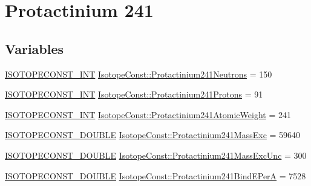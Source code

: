 \hypertarget{group___isotope_const-_protactinium-_pa241}{}\section{Protactinium 241}
\label{group___isotope_const-_protactinium-_pa241}
\subsection*{Variables}
\begin{DoxyCompactItemize}
\item 
\mbox{\hyperlink{group___isotope_const-_macros_ga5f18360b3e99483a35c32d789e62621c}{I\+S\+O\+T\+O\+P\+E\+C\+O\+N\+S\+T\+\_\+\+I\+NT}} \mbox{\hyperlink{group___isotope_const-_protactinium-_pa241_ga96848d089fc9546639a6c1897e31b6eb}{Isotope\+Const\+::\+Protactinium241\+Neutrons}} = 150
\item 
\mbox{\hyperlink{group___isotope_const-_macros_ga5f18360b3e99483a35c32d789e62621c}{I\+S\+O\+T\+O\+P\+E\+C\+O\+N\+S\+T\+\_\+\+I\+NT}} \mbox{\hyperlink{group___isotope_const-_protactinium-_pa241_ga6141335e587b00dd1ee24da6cf1ba240}{Isotope\+Const\+::\+Protactinium241\+Protons}} = 91
\item 
\mbox{\hyperlink{group___isotope_const-_macros_ga5f18360b3e99483a35c32d789e62621c}{I\+S\+O\+T\+O\+P\+E\+C\+O\+N\+S\+T\+\_\+\+I\+NT}} \mbox{\hyperlink{group___isotope_const-_protactinium-_pa241_gad6c15872b7ec3eb84331a6369505485d}{Isotope\+Const\+::\+Protactinium241\+Atomic\+Weight}} = 241
\item 
\mbox{\hyperlink{group___isotope_const-_macros_ga8f45a7272ce02c0b4c65c44636ed719a}{I\+S\+O\+T\+O\+P\+E\+C\+O\+N\+S\+T\+\_\+\+D\+O\+U\+B\+LE}} \mbox{\hyperlink{group___isotope_const-_protactinium-_pa241_ga80c3dda72c91b2072f796718167b7811}{Isotope\+Const\+::\+Protactinium241\+Mass\+Exc}} = 59640
\item 
\mbox{\hyperlink{group___isotope_const-_macros_ga8f45a7272ce02c0b4c65c44636ed719a}{I\+S\+O\+T\+O\+P\+E\+C\+O\+N\+S\+T\+\_\+\+D\+O\+U\+B\+LE}} \mbox{\hyperlink{group___isotope_const-_protactinium-_pa241_gafe243e933265bdfe5fff0a468d18b00f}{Isotope\+Const\+::\+Protactinium241\+Mass\+Exc\+Unc}} = 300
\item 
\mbox{\hyperlink{group___isotope_const-_macros_ga8f45a7272ce02c0b4c65c44636ed719a}{I\+S\+O\+T\+O\+P\+E\+C\+O\+N\+S\+T\+\_\+\+D\+O\+U\+B\+LE}} \mbox{\hyperlink{group___isotope_const-_protactinium-_pa241_gaa952e80a916d29ce1665abb9a350a761}{Isotope\+Const\+::\+Protactinium241\+Bind\+E\+PerA}} = 7528

\end{DoxyCompactItemize}
